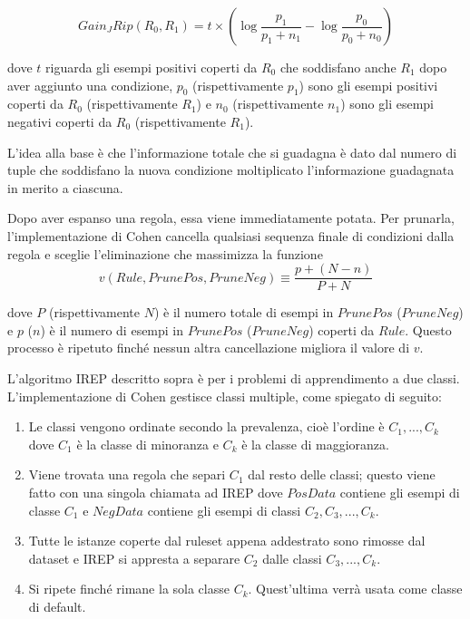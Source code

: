 $$
Gain_JRip(R_0,R_1) = t \times \left(\log{\dfrac{p_1}{p_1 + n_1}} - \log{\dfrac{p_0}{p_0 + n_0}}\right)
$$

dove $t$ riguarda gli esempi positivi coperti da $R_0$ che soddisfano anche $R_1$ dopo aver aggiunto una condizione, $p_0$ (rispettivamente $p_1$) sono gli esempi positivi coperti da $R_0$ (rispettivamente $R_1$) e  $n_0$ (rispettivamente $n_1$) sono gli esempi negativi coperti da $R_0$ (rispettivamente $R_1$).

L'idea alla base è che l'informazione totale che si guadagna è dato dal numero di tuple che soddisfano la nuova condizione moltiplicato l'informazione guadagnata in merito a ciascuna\cite{Quinlan1990}.

Dopo aver espanso una regola, essa viene immediatamente potata. Per prunarla, l'implementazione di Cohen cancella qualsiasi sequenza finale di condizioni dalla regola e sceglie l'eliminazione che massimizza la funzione
\begin{equation}
	\label{eq:rulval}
	v(Rule, PrunePos, PruneNeg) \equiv \frac{p + (N - n)}{P + N}
\end{equation}

dove $P$ (rispettivamente $N$) è il numero totale di esempi in $PrunePos$ \linebreak ($PruneNeg$) e $p$ ($n$) è il numero di esempi in $PrunePos$ ($PruneNeg$) coperti da $Rule$. Questo processo è ripetuto finché nessun altra cancellazione migliora il valore di $v$.

L'algoritmo IREP descritto sopra è per i problemi di apprendimento a due classi. L'implementazione di Cohen gestisce classi multiple, come spiegato di seguito:
\begin{enumerate}
	\item Le classi vengono ordinate secondo la prevalenza, cioè l'ordine è $C_1,...,C_k$ dove $C_1$ è la classe di minoranza e $C_k$ è la classe di maggioranza.
	\item Viene trovata una regola che separi $C_1$ dal resto delle classi; questo viene fatto con una singola chiamata ad IREP dove $PosData$ contiene gli esempi di classe $C_1$ e $NegData$ contiene gli esempi di classi $C_2,C_3,...,C_k$.
	\item Tutte le istanze coperte dal ruleset appena addestrato sono rimosse dal dataset e IREP si appresta a separare $C_2$ dalle classi $C_3,...,C_k$.
	\item Si ripete finché rimane la sola classe $C_k$. Quest'ultima verrà usata come classe di default.
\end{enumerate}

